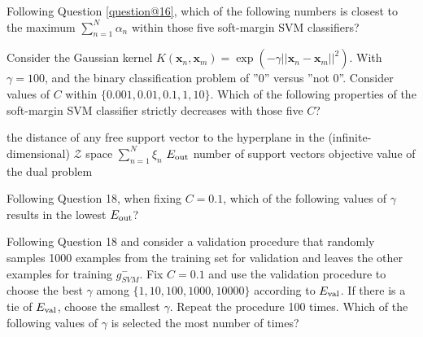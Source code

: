 \documentclass[a4paper,10pt]{exam}
\begin{document}
\begin{questions}
  \question Following Question \ref{question@16}, which of the following numbers is closest to the maximum $\sum_{n=1}^N \alpha_n$ within those five soft-margin SVM classifiers?
  \begin{checkboxes}
  \end{checkboxes}
  
  \question Consider the Gaussian kernel $K(\mathbf{x}_n,\mathbf{x}_m)= \exp\left(-\gamma ||\mathbf{x}_n - \mathbf{x}_m||^2 \right)$. With $\gamma = 100$, and the binary classification problem of ''0'' versus ''not 0''. Consider values of $C$ within $\{0.001, 0.01, 0.1, 1, 10\}$. Which of the following properties of the soft-margin SVM classifier strictly decreases with those five $C$?
  \begin{checkboxes}
  	\CorrectChoice the distance of any free support vector to the hyperplane in the (infinite-dimensional) $\mathcal{Z}$ space
  	\CorrectChoice $\sum_{n=1}^N \xi_n$
  	\choice $E_{\rm out}$
  	\choice number of support vectors
  	\CorrectChoice objective value of the dual problem 	
  \end{checkboxes}
  
  \question Following Question 18, when fixing $C=0.1$, which of the following values of $\gamma$ results in the lowest $E_{\rm out}$?
  \begin{checkboxes}
  \end{checkboxes}
  
  \question Following Question 18 and consider a validation procedure that randomly samples 1000 examples from the training set for validation and leaves the other examples for training $g^{-}_{SVM}$. Fix $C=0.1$ and use the validation procedure to choose the best $\gamma$ among $\{1, 10, 100, 1000, 10000\}$ according to $E_{\rm val}$. If there is a tie of $E_{\rm val}$, choose the smallest $\gamma$. Repeat the procedure 100 times. Which of the following values of $\gamma$ is selected the most number of times?
  
  \begin{checkboxes}
  \end{checkboxes}
\end{questions}
\clearpage 
\end{document}
